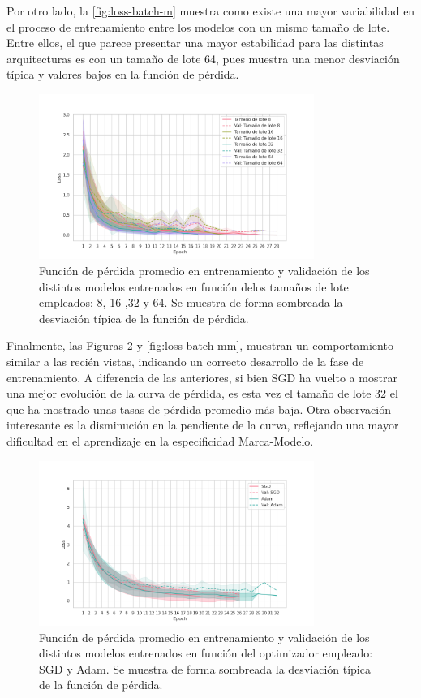 Por otro lado, la \autoref{fig:loss-batch-m} muestra como existe una mayor
variabilidad en el proceso de entrenamiento entre los modelos con un mismo
tamaño de lote. Entre ellos, el que parece presentar una mayor estabilidad para
las distintas arquitecturas es con un tamaño de lote 64, pues muestra una menor desviación
típica y valores bajos en la función de pérdida.

\begin{figure}[H]
	\centering
	\includegraphics[width=0.8\textwidth]{img/loss-batch-marca.png}
	\caption{Función de pérdida promedio en entrenamiento y validación de los
		distintos modelos entrenados en función delos tamaños de lote empleados: 8, 16
		,32 y 64. Se muestra de forma sombreada la desviación típica de la función de pérdida.}
	\label{fig:loss-batch-m}
\end{figure}

Finalmente, las Figuras \ref{fig:loss-optim-mm} y \ref{fig:loss-batch-mm},
muestran un comportamiento similar a las recién vistas, indicando un correcto desarrollo
de la fase de entrenamiento. A diferencia de las anteriores, si bien SGD ha vuelto
a mostrar una mejor evolución de la curva de pérdida, es esta vez el tamaño de
lote 32 el que ha mostrado unas tasas de pérdida promedio más baja. Otra observación
interesante es la disminución en la pendiente de la curva, reflejando una mayor
dificultad en el aprendizaje en la especificidad Marca-Modelo.

\begin{figure}[H]
	\centering
	\includegraphics[width=0.8\textwidth]{img/loss-optimizer-marca-modelo.png}
	\caption{Función de pérdida promedio en entrenamiento y validación de los
		distintos modelos entrenados en función del optimizador empleado: SGD y Adam.
		Se muestra de forma sombreada la desviación típica de la función de pérdida.}
	\label{fig:loss-optim-mm}
\end{figure}

